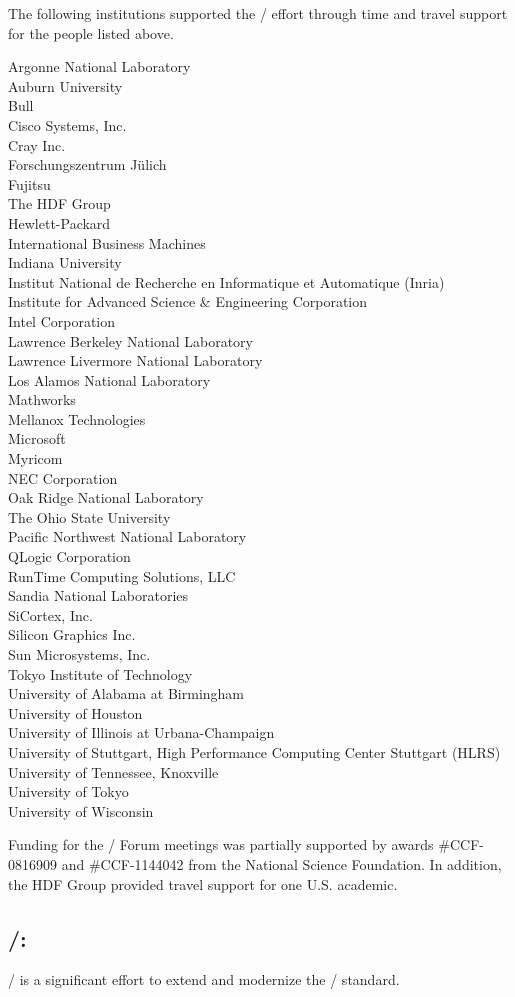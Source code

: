 The following institutions supported the \MPIIIDOTII/ effort through
time and travel support for the people listed above.

\medskip

\begin{obeylines}
Argonne National Laboratory
Auburn University
Bull 
Cisco Systems, Inc.
Cray Inc.
Forschungszentrum J\"ulich
Fujitsu
The HDF Group
Hewlett-Packard
International Business Machines
Indiana University
Institut National de Recherche en Informatique et Automatique (Inria)
Institute for Advanced Science \& Engineering Corporation
Intel Corporation
Lawrence Berkeley National Laboratory
Lawrence Livermore National Laboratory
Los Alamos National Laboratory
Mathworks
Mellanox Technologies
Microsoft
Myricom
NEC Corporation
Oak Ridge National Laboratory
The Ohio State University
Pacific Northwest National Laboratory
QLogic Corporation
RunTime Computing Solutions, LLC
Sandia National Laboratories
SiCortex, Inc.
Silicon Graphics Inc.
Sun Microsystems, Inc.
Tokyo Institute of Technology
University of Alabama at Birmingham
University of Houston
University of Illinois at Urbana-Champaign
University of Stuttgart, High Performance Computing Center Stuttgart (HLRS)
University of Tennessee, Knoxville
University of Tokyo
University of Wisconsin
\end{obeylines}

\medskip

Funding for the \MPI/ Forum meetings was partially supported by
awards 
\#CCF-0816909 and \#CCF-1144042 from the National Science Foundation.   
In addition, the HDF Group provided travel support for one
U.S. academic.

\subsection*{\mpiiiidoto/:}
\mpiiiidoto/ is a significant effort to extend and modernize the \MPI/
standard.

